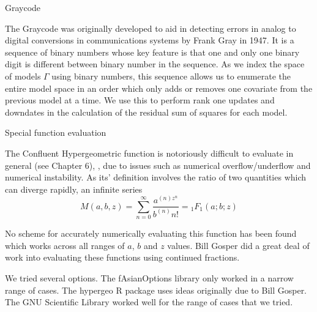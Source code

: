 \documentclass{amsart}
\begin{document}
Graycode

The Graycode was originally developed to aid in detecting errors in analog to digital conversions in
communications systems by Frank Gray in 1947. It is a sequence of binary numbers whose key feature is that
one and only one binary digit is different between binary number in the sequence. As we index the space of
models $\Gamma$ using binary numbers, this sequence allows us to enumerate the entire model space in an order
which only adds or removes one covariate from the previous model at a time. We use this to perform rank
one updates and downdates in the calculation of the residual sum of squares for each model.

Special function evaluation

The Confluent Hypergeometric function is notoriously difficult to evaluate in general (see
\cite{Press:2007:NRE:1403886} Chapter 6), , due to issues such as numerical overflow/underflow and numerical
instability. As its' definition involves the ratio of two quantities which can diverge rapidly, an infinite
series
\[
	M(a, b, z) = \sum_{n=0}^\infty \frac{a^{(n) z^n}}{b^{(n)} n!} = {_1} F_1(a; b; z)
\]

No scheme for accurately numerically evaluating this function has been found which works across all ranges of
$a$, $b$ and $z$ values. Bill Gosper did a great deal of work into evaluating these functions using continued
fractions.

We tried several options. The fAsianOptions library only worked in a narrow range of cases. 
The hypergeo R package uses ideas originally due to Bill Gosper.
The GNU Scientific Library worked well for the range of cases that we tried.



\end{document}
